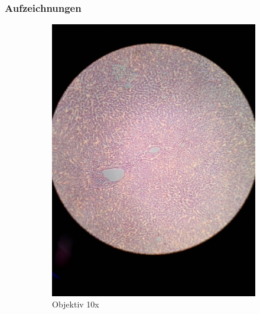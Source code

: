 \subsubsection{Aufzeichnungen}
\begin{figure}[h!]
	\centering
	\begin{subfigure}[b]{0.3\textwidth}
		\includegraphics[width=1\textwidth]{../images/01_human_liver.jpg}
		\caption{Objektiv 10x}
		\label{fig:01_human_liver}
	\end{subfigure}
	\begin{subfigure}[b]{0.3\textwidth}

\end{subfigure}
\end{figure}
